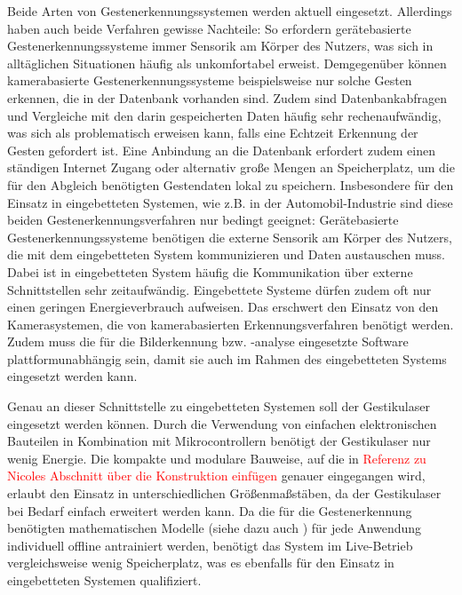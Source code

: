 Beide Arten von Gestenerkennungssystemen werden aktuell eingesetzt. Allerdings haben auch beide Verfahren gewisse Nachteile: So erfordern gerätebasierte Gestenerkennungssysteme immer Sensorik am Körper des Nutzers, was sich in alltäglichen Situationen häufig als unkomfortabel erweist. Demgegenüber können kamerabasierte Gestenerkennungssysteme beispielsweise nur solche Gesten erkennen, die in der Datenbank vorhanden sind. Zudem sind Datenbankabfragen und Vergleiche mit den darin gespeicherten Daten häufig sehr rechenaufwändig, was sich als problematisch erweisen kann, falls eine Echtzeit Erkennung der Gesten gefordert ist. Eine Anbindung an die Datenbank erfordert zudem einen ständigen Internet Zugang oder alternativ große Mengen an Speicherplatz, um die für den Abgleich benötigten Gestendaten lokal zu speichern. Insbesondere für den Einsatz in eingebetteten Systemen, wie z.B. in der Automobil-Industrie sind diese beiden Gestenerkennungsverfahren nur bedingt geeignet: Gerätebasierte Gestenerkennungssysteme benötigen die externe Sensorik am Körper des Nutzers, die mit dem eingebetteten System kommunizieren und Daten austauschen muss. Dabei ist in eingebetteten System häufig die Kommunikation über externe Schnittstellen sehr zeitaufwändig. Eingebettete Systeme dürfen zudem oft nur einen geringen Energieverbrauch aufweisen. Das erschwert den Einsatz von den Kamerasystemen, die von kamerabasierten Erkennungsverfahren benötigt werden. Zudem muss die für die Bilderkennung bzw. -analyse eingesetzte Software plattformunabhängig sein, damit sie auch im Rahmen des eingebetteten Systems eingesetzt werden kann.

Genau an dieser Schnittstelle zu eingebetteten Systemen soll der Gestikulaser eingesetzt werden können. Durch die Verwendung von einfachen elektronischen Bauteilen in Kombination mit Mikrocontrollern benötigt der Gestikulaser nur wenig Energie. Die kompakte und modulare Bauweise, auf die in \textcolor{red}{Referenz zu Nicoles Abschnitt über die Konstruktion einfügen} genauer eingegangen wird, erlaubt den Einsatz in unterschiedlichen Größenmaßstäben, da der Gestikulaser bei Bedarf einfach erweitert werden kann. Da die für die Gestenerkennung benötigten mathematischen Modelle (siehe dazu auch ) für jede Anwendung individuell offline antrainiert werden, benötigt das System im Live-Betrieb vergleichsweise wenig Speicherplatz, was es ebenfalls für den Einsatz in eingebetteten Systemen qualifiziert.